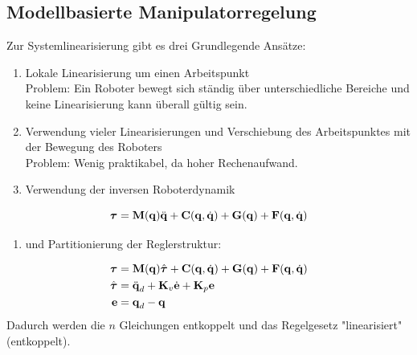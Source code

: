 		\subsection{Modellbasierte Manipulatorregelung}
			Zur Systemlinearisierung gibt es drei Grundlegende Ansätze:
			\begin{enumerate}
				\item Lokale Linearisierung um einen Arbeitspunkt \\ Problem: Ein Roboter bewegt sich ständig über unterschiedliche Bereiche und keine Linearisierung kann überall gültig sein.
				\item Verwendung vieler Linearisierungen und Verschiebung des Arbeitspunktes mit der Bewegung des Roboters \\ Problem: Wenig praktikabel, da hoher Rechenaufwand.
				\item Verwendung der inversen Roboterdynamik
			\end{enumerate}
			\begin{equation*}
				\boldsymbol{\mathrm{\tau}} = \boldsymbol{\mathrm{M}}(\boldsymbol{\mathrm{q}}) \ddot{\boldsymbol{\mathrm{q}}} + \boldsymbol{\mathrm{C}}(\boldsymbol{\mathrm{q}}, \dot{\boldsymbol{\mathrm{q}}}) + \boldsymbol{\mathrm{G}}(\boldsymbol{\mathrm{q}}) + \boldsymbol{\mathrm{F}}(\boldsymbol{\mathrm{q}}, \dot{\boldsymbol{\mathrm{q}}})
			\end{equation*}
			\begin{enumerate}
				\item[] und Partitionierung der Reglerstruktur:
			\end{enumerate}
			\vspace{-0.5cm}
			\begin{align*}
				\boldsymbol{\mathrm{\tau}}       & = \boldsymbol{\mathrm{M}}(\boldsymbol{\mathrm{q}})\hat{\boldsymbol{\mathrm{\tau}}} + \boldsymbol{\mathrm{C}}(\boldsymbol{\mathrm{q}}, \dot{\boldsymbol{\mathrm{q}}}) + \boldsymbol{\mathrm{G}}(\boldsymbol{\mathrm{q}}) + \boldsymbol{\mathrm{F}}(\boldsymbol{\mathrm{q}}, \dot{\boldsymbol{\mathrm{q}}}) \\
				\hat{\boldsymbol{\mathrm{\tau}}} & = \ddot{\boldsymbol{\mathrm{q}}}_d + \boldsymbol{\mathrm{K}}_v \dot{\boldsymbol{\mathrm{e}}} + \boldsymbol{\mathrm{K}}_p \boldsymbol{\mathrm{e}}                                                          \\
				\boldsymbol{\mathrm{e}}          & = \boldsymbol{\mathrm{q}}_d - \boldsymbol{\mathrm{q}}
			\end{align*}
			Dadurch werden die \(n\) Gleichungen entkoppelt und das Regelgesetz "linearisiert" (entkoppelt).
			
